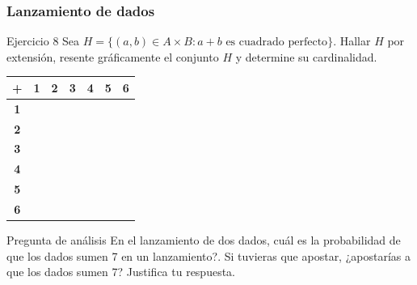 \documentclass[aspectratio=169]{beamer}
\begin{document}
\begin{frame}[t]
	\frametitle{Lanzamiento de dados}
	\begin{block}{Ejercicio 8}
		Sea $H=\{(a, b)\in A\times B: a+b\text{ es cuadrado perfecto}\}$. Hallar $H$ por extensión, resente gráficamente el conjunto $H $ y determine su cardinalidad.
	\end{block}


	\renewcommand{\arraystretch}{1.3} %
	\begin{flushleft}
		\begin{tabular}{|c|*{6}{c|}}
			\hline
			\cellcolor{gray!30} \textbf{+}
			                                & \cellcolor{yellow} \textbf{1}
			                                & \cellcolor{yellow} \textbf{2}
			                                & \cellcolor{yellow} \textbf{3}
			                                & \cellcolor{yellow} \textbf{4}
			                                & \cellcolor{yellow} \textbf{5}
			                                & \cellcolor{yellow} \textbf{6}               \\
			\hline
			\cellcolor{green!70} \textbf{1} &                               &  &  &  &  & \\ \hline
			\cellcolor{green!70} \textbf{2} &                               &  &  &  &  & \\ \hline
			\cellcolor{green!70} \textbf{3} &                               &  &  &  &  & \\ \hline
			\cellcolor{green!70} \textbf{4} &                               &  &  &  &  & \\ \hline
			\cellcolor{green!70} \textbf{5} &                               &  &  &  &  & \\ \hline
			\cellcolor{green!70} \textbf{6} &                               &  &  &  &  & \\
			\hline
		\end{tabular}
	\end{flushleft}
\end{frame}


\begin{frame}[t]{Pregunta de análisis}
	En el lanzamiento de dos dados, cuál es la probabilidad de que los dados sumen 7 en un lanzamiento?. Si tuvieras que apostar, ¿apostarías a que los dados sumen 7? Justifica tu respuesta.
\end{frame}
\end{document}
